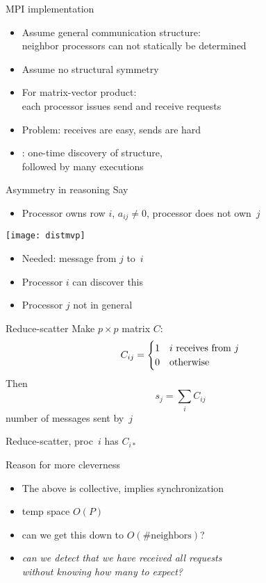 \begin{frame}{MPI implementation}
\begin{itemize}
\item Assume general communication structure:\\
  neighbor processors can not statically be determined
\item Assume no structural symmetry
\item For matrix-vector product:\\
  each processor issues send and receive requests
\item Problem: receives are easy, sends are hard
\item {}: one-time discovery of structure,\\
  followed by many executions
\end{itemize}
\end{frame}

\begin{frame}{Asymmetry in reasoning}
Say
\begin{itemize}
\item Processor owns row $i$, $a_{ij}\not=0$, processor does not own~$j$
\end{itemize}
  \texttt{[image: distmvp]}\\
  \begin{itemize}
  \item Needed: message from $j$ to~$i$
  \item Processor $i$ can discover this
  \item Processor $j$ not in general
  \end{itemize}
\end{frame}

\begin{frame}{Reduce-scatter}
Make $p\times p$ matrix $C$:
\[ C_{ij}=
\begin{cases}
  1&\hbox{$i$ receives from $j$}\\ 0&\hbox{otherwise}
\end{cases}
\]
Then \[ s_j = \sum_i C_{ij} \]
number of messages sent by~$j$

Reduce-scatter, proc~$i$ has $C_{i*}$
\end{frame}

\begin{frame}{Reason for more cleverness}
  \begin{itemize}
  \item The above is collective, implies synchronization
  \item temp space $O(P)$
  \item can we get this down to $O(\#\mathrm{neighbors})$?
  \item \textsl{can we detect that we have received all requests\\
    without knowing how many to expect?}
  \end{itemize}
\end{frame}


